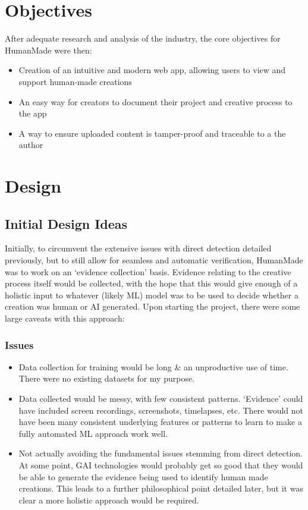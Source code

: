 \documentclass[12pt,a4paper]{article}
\begin{document}
\section{Objectives}
After adequate research and analysis of the industry, the core objectives for HumanMade were then:
\begin{itemize}
    \item Creation of an intuitive and modern web app, allowing users to view and support human-made creations
    \item An easy way for creators to document their project and creative process to the app
    \item A way to ensure uploaded content is tamper-proof and traceable to a the author
\end{itemize}
\section{Design}
\subsection{Initial Design Ideas}
Initially, to circumvent the extensive issues with direct detection detailed previously, but to still allow for seamless and automatic verification, HumanMade was to work on an `evidence collection' basis. Evidence relating to the creative process itself would be collected, with the hope that this would give enough of a holistic input to whatever (likely ML) model was to be used to decide whether a creation was human or AI generated. Upon starting the project, there were some large caveats with this approach:
\subsubsection{Issues}
\begin{itemize}
    \item Data collection for training would be long \& an unproductive use of time. There were no existing datasets for my purpose.
    \item Data collected would be messy, with few consistent patterns. `Evidence' could have included screen recordings, screenshots, timelapses, etc. There would not have been many consistent underlying features or patterns to learn to make a fully automated ML approach work well.
    \item Not actually avoiding the fundamental issues stemming from direct detection. At some point, GAI technologies would probably get so good that they would be able to generate the evidence being used to identify human made creations. This leads to a further philosophical point detailed later, but it was clear a more holistic approach would be required.
\end{itemize}
\end{document}
